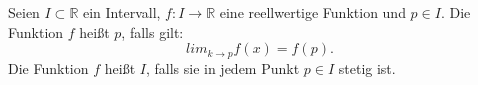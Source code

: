 Seien $I \subset \mathbb{R}$ ein Intervall, $f : I \to \mathbb{R}$ eine reellwertige Funktion und $p \in I$. Die Funktion $f$ heißt
 $p$, falls gilt: 
$$lim_{k \to p} f(x) = f(p).$$
Die Funktion $f$ heißt  $I$, falls sie in jedem Punkt $p \in I$ stetig ist.